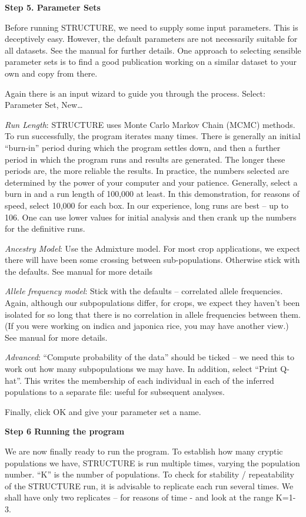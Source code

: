 \documentclass[
]{book}
\begin{document}
\textbf{Step 5. Parameter Sets}

Before running STRUCTURE, we need to supply some input parameters. This is deceptively easy. However, the default parameters are not necessarily suitable for all datasets. See the manual for further details. One approach to selecting sensible parameter sets is to find a good publication working on a similar dataset to your own and copy from there.

Again there is an input wizard to guide you through the process. Select: Parameter Set, New\ldots{}

\emph{Run Length}: STRUCTURE uses Monte Carlo Markov Chain (MCMC) methods. To run successfully, the program iterates many times. There is generally an initial ``burn-in'' period during which the program settles down, and then a further period in which the program runs and results are generated. The longer these periods are, the more reliable the results. In practice, the numbers selected are determined by the power of your computer and your patience. Generally, select a burn in and a run length of 100,000 at least. In this demonstration, for reasons of speed, select 10,000 for each box. In our experience, long runs are best -- up to 106. One can use lower values for initial analysis and then crank up the numbers for the definitive runs.

\emph{Ancestry Model}: Use the Admixture model. For most crop applications, we expect there will have been some crossing between sub-populations. Otherwise stick with the defaults. See manual for more details

\emph{Allele frequency model}: Stick with the defaults -- correlated allele frequencies. Again, although our subpopulations differ, for crops, we expect they haven't been isolated for so long that there is no correlation in allele frequencies between them. (If you were working on indica and japonica rice, you may have another view.) See manual for more details.

\emph{Advanced}: ``Compute probability of the data'' should be ticked -- we need this to work out how many subpopulations we may have. In addition, select ``Print Q-hat''. This writes the membership of each individual in each of the inferred populations to a separate file: useful for subsequent analyses.

Finally, click OK and give your parameter set a name.

\textbf{Step 6 Running the program}

We are now finally ready to run the program. To establish how many cryptic populations we have, STRUCTURE is run multiple times, varying the population number. ``K'' is the number of populations. To check for stability / repeatability of the STRUCTURE run, it is advisable to replicate each run several times. We shall have only two replicates -- for reasons of time - and look at the range K=1-3.
\end{document}
